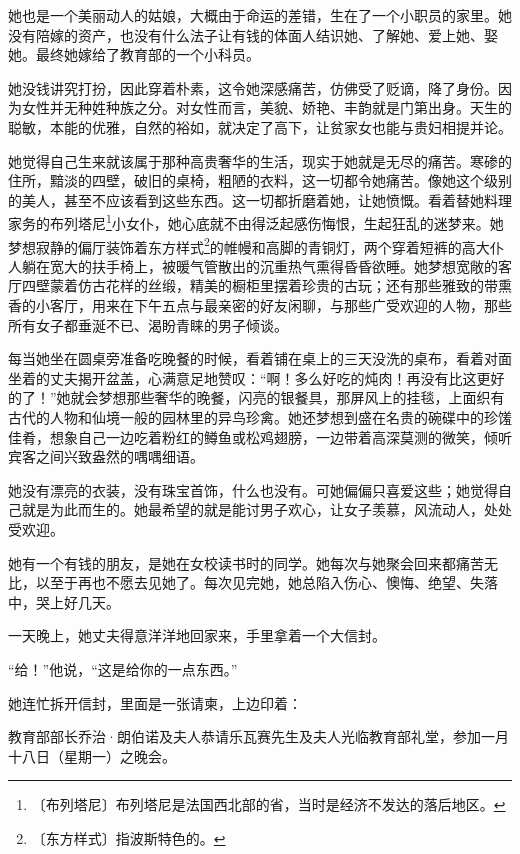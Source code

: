 \documentclass[12pt,UTF-8,openany]{ctexbook}
\begin{document}
\begin{normalsize}
    
    她也是一个美丽动人的姑娘，大概由于命运的差错，生在了一个小职员的家里。她没有陪嫁的资产，也没有什么法子让有钱的体面人结识她、了解她、爱上她、娶她。最终她嫁给了教育部的一个小科员。
    
    她没钱讲究打扮，因此穿着朴素，这令她深感痛苦，仿佛受了贬谪，降了身份。因为女性并无种姓种族之分。对女性而言，美貌、娇艳、丰韵就是门第出身。天生的聪敏，本能的优雅，自然的裕如，就决定了高下，让贫家女也能与贵妇相提并论。
    
    她觉得自己生来就该属于那种高贵奢华的生活，现实于她就是无尽的痛苦。寒碜的住所，黯淡的四壁，破旧的桌椅，粗陋的衣料，这一切都令她痛苦。像她这个级别的美人，甚至不应该看到这些东西。这一切都折磨着她，让她愤慨。看着替她料理家务的布列塔尼\footnote{〔布列塔尼〕布列塔尼是法国西北部的省，当时是经济不发达的落后地区。}小女仆，她心底就不由得泛起感伤悔恨，生起狂乱的迷梦来。她梦想寂静的偏厅装饰着东方样式\footnote{〔东方样式〕指波斯特色的。}的帷幔和高脚的青铜灯，两个穿着短裤的高大仆人躺在宽大的扶手椅上，被暖气管散出的沉重热气熏得昏昏欲睡。她梦想宽敞的客厅四壁蒙着仿古花样的丝缎，精美的橱柜里摆着珍贵的古玩；还有那些雅致的带熏香的小客厅，用来在下午五点与最亲密的好友闲聊，与那些广受欢迎的人物，那些所有女子都垂涎不已、渴盼青睐的男子倾谈。
    
    每当她坐在圆桌旁准备吃晚餐的时候，看着铺在桌上的三天没洗的桌布，看着对面坐着的丈夫揭开盆盖，心满意足地赞叹：“啊！多么好吃的炖肉！再没有比这更好的了！”她就会梦想那些奢华的晚餐，闪亮的银餐具，那屏风上的挂毯，上面织有古代的人物和仙境一般的园林里的异鸟珍禽。她还梦想到盛在名贵的碗碟中的珍馐佳肴，想象自己一边吃着粉红的鳟鱼或松鸡翅膀，一边带着高深莫测的微笑，倾听宾客之间兴致盎然的喁喁细语。
    
    她没有漂亮的衣装，没有珠宝首饰，什么也没有。可她偏偏只喜爱这些；她觉得自己就是为此而生的。她最希望的就是能讨男子欢心，让女子羡慕，风流动人，处处受欢迎。
    
    她有一个有钱的朋友，是她在女校读书时的同学。她每次与她聚会回来都痛苦无比，以至于再也不愿去见她了。每次见完她，她总陷入伤心、懊悔、绝望、失落中，哭上好几天。
    
    一天晚上，她丈夫得意洋洋地回家来，手里拿着一个大信封。
    
    “给！”他说，“这是给你的一点东西。”
    
    她连忙拆开信封，里面是一张请柬，上边印着：
    
    教育部部长乔治·朗伯诺及夫人恭请乐瓦赛先生及夫人光临教育部礼堂，参加一月十八日（星期一）之晚会。
    

\end{normalsize}
\end{document}
